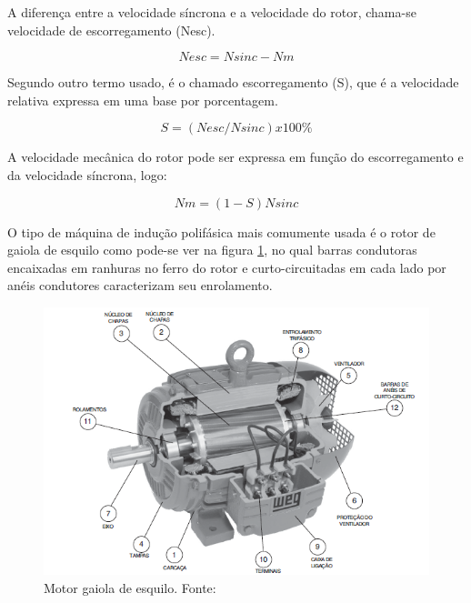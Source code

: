 A diferença entre a velocidade síncrona e a velocidade do rotor, chama-se velocidade de escorregamento (Nesc). \cite{chapman}

    \begin{equation}\label{Velocidade de Escorregamento .}
            Nesc=Nsinc-Nm
    \end{equation}


Segundo \cite{chapman} outro termo usado, é o chamado escorregamento (S), que é a velocidade relativa expressa em uma base por porcentagem.


  \begin{equation}\label{Escorregamento S}
           S=(Nesc/Nsinc) x 100\%
    \end{equation}

A velocidade mecânica do rotor pode ser expressa em função do escorregamento e da velocidade síncrona, logo:


  \begin{equation}\label{Velocidade Mecânica do Rotor}
         Nm=(1-S)Nsinc
    \end{equation}

O tipo de máquina de indução polifásica mais comumente usada é o rotor de gaiola de esquilo como pode-se ver na figura \ref{fig:motor}, no qual barras condutoras encaixadas em ranhuras no ferro do rotor e curto-circuitadas em cada lado por anéis condutores caracterizam seu enrolamento. \cite{Fitzgerald}
\\
\begin{figure}[t]
\centering
\includegraphics[keepaspectratio=true,scale=0.8]{figuras/motor.png}
\caption{Motor gaiola de esquilo. Fonte:\cite{WEG}}
\label{fig:motor}

\end{figure}


